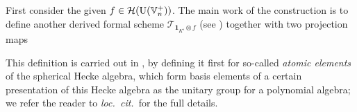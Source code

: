 First consider the given $f \in \mathcal H(\operatorname{U}(\mathbb V_n^+))$.
The main work of the construction is to define another
derived formal scheme $\mathcal{T}_{\mathbf{1}_{K^\flat} \otimes f}$
(see \cite[\S6.1]{ref:AFLspherical}) together with two projection maps
\begin{center}
\end{center}
This definition is carried out in \cite[\S5]{ref:AFLspherical},
by defining it first for so-called \emph{atomic elements} of the spherical Hecke algebra,
which form basis elements of a certain presentation of this Hecke algebra
as the unitary group for a polynomial algebra;
we refer the reader to \emph{loc.\ cit.}~for the full details.


